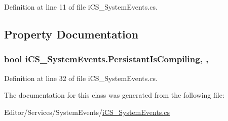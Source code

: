 Definition at line 11 of file i\+C\+S\+\_\+\+System\+Events.\+cs.



\subsection{Property Documentation}
\hypertarget{classi_c_s___system_events_a9864fc55b3b1026d2cff103f67804099}{
\subsubsection[{Persistant\+Is\+Compiling}]{\setlength{\rightskip}{0pt plus 5cm}bool i\+C\+S\+\_\+\+System\+Events.\+Persistant\+Is\+Compiling\hspace{0.3cm}{\ttfamily [static]}, {\ttfamily [get]}, {\ttfamily [set]}}}\label{classi_c_s___system_events_a9864fc55b3b1026d2cff103f67804099}


Definition at line 32 of file i\+C\+S\+\_\+\+System\+Events.\+cs.



The documentation for this class was generated from the following file\+:\begin{DoxyCompactItemize}
\item 
Editor/\+Services/\+System\+Events/\hyperlink{i_c_s___system_events_8cs}{i\+C\+S\+\_\+\+System\+Events.\+cs}\end{DoxyCompactItemize}
